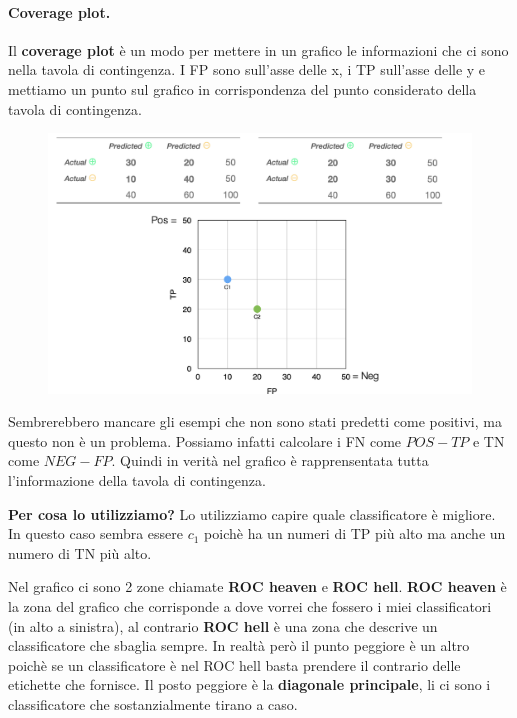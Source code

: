 \paragraph{Coverage plot.} Il \textbf{coverage plot} è un modo per mettere in un grafico le informazioni che ci sono nella tavola di contingenza. I FP sono sull'asse delle x, i TP sull'asse delle y e mettiamo un punto sul grafico in corrispondenza del punto considerato della tavola di contingenza.
\begin{figure}[!h]
    \centering
    \includegraphics[scale=0.5]{images/covPlot.png}
    \label{fig:enter-label}
\end{figure}

Sembrerebbero mancare gli esempi che non sono stati predetti come positivi, ma questo non è un problema. Possiamo infatti calcolare i FN come $POS-TP$ e TN come $NEG-FP$. Quindi in verità nel grafico è rapprensentata tutta l'informazione della tavola di contingenza.

\textbf{Per cosa lo utilizziamo?} Lo utilizziamo capire quale classificatore è migliore. In questo caso sembra essere $c_1$ poichè ha un numeri di TP più alto ma anche un numero di TN più alto. 

Nel grafico ci sono 2 zone chiamate \textbf{ROC heaven} e \textbf{ROC hell}. \textbf{ROC heaven} è la zona del grafico che corrisponde a dove vorrei che fossero i miei classificatori (in alto a sinistra), al contrario \textbf{ROC hell} è una zona che descrive un classificatore che sbaglia sempre. In realtà però il punto peggiore è un altro poichè se un classificatore è nel ROC hell basta prendere il contrario delle etichette che fornisce. Il posto peggiore è la \textbf{diagonale principale}, li ci sono i classificatore che sostanzialmente tirano a caso.

